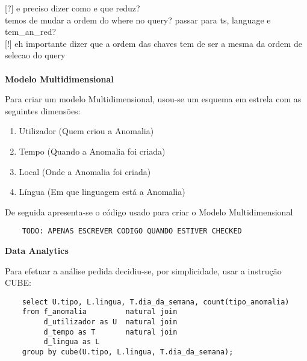 \documentclass[12pt]{report}
\begin{document}
    [?] e preciso dizer como e que reduz?\\
    [?] temos de mudar a ordem do where no query? passar para ts, language e tem\_an\_red?\\
    
    [!] eh importante dizer que a ordem das chaves tem de ser a mesma da ordem de selecao do query
    \\
    \\
    \Large
    \textbf{Modelo Multidimensional}\\
    \normalsize
    \par Para criar um modelo Multidimensional, usou-se um esquema em estrela com as seguintes  dimensões:
    
    \begin{enumerate}[leftmargin=3\parindent]
        \item Utilizador (Quem criou a Anomalia)
        \item Tempo (Quando a Anomalia foi criada)
        \item Local (Onde a Anomalia foi criada)
        \item Língua (Em que linguagem está a Anomalia)
    \end{enumerate}

    \par De seguida apresenta-se o código usado para criar o Modelo Multidimensional
    \small \begin{verbatim}
    TODO: APENAS ESCREVER CODIGO QUANDO ESTIVER CHECKED
    \end{verbatim}\normalsize
    
    
    \Large
    \textbf{Data Analytics}\\
    \normalsize
    \par Para efetuar a análise pedida decidiu-se, por simplicidade, usar a instrução CUBE:
    \small \begin{verbatim}
    select U.tipo, L.lingua, T.dia_da_semana, count(tipo_anomalia) 
    from f_anomalia         natural join
         d_utilizador as U  natural join
         d_tempo as T       natural join 
         d_lingua as L 
    group by cube(U.tipo, L.lingua, T.dia_da_semana);
    \end{verbatim}\normalsize
\end{document}
